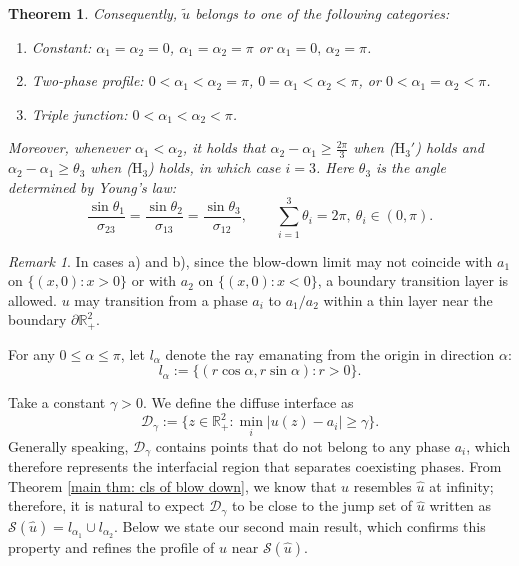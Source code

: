 \documentclass[leqno,11pt]{amsart}
\let\pa=\partial
\let\al=\alpha
\let\g=\gamma
\let\f=\frac
\let\pa=\partial
\newtheorem{theorem}{Theorem}[section]
\theoremstyle{remark}
\newtheorem{rmk}{Remark}[section]
\newcommand{\BR}{\mathbb{R}}
\begin{document}
\begin{theorem}
    
    Consequently, $\tilde{u}$ belongs to one of the following categories:
      \begin{enumerate}[label={\alph*)}]
        \item Constant: $\al_1=\al_2=0$, $\al_1=\al_2=\pi$ or $\al_1=0,\, \al_2=\pi$.
        \item Two-phase profile: $0<\al_1<\al_2=\pi$, $0=\al_1<\al_2<\pi$, or $0<\al_1=\al_2<\pi$.
        \item Triple junction: $0<\al_1<\al_2<\pi$.
    \end{enumerate}  
    Moreover, whenever $\al_1<\al_2$, it holds that $\al_2-\al_1\geq \f{2\pi}{3}$ when ($\mathrm{H}_3'$) holds and $\al_2-\al_1\geq \theta_3$ when ($\mathrm{H}_3$) holds, in which case $i=3$. Here $\theta_3$ is the angle determined by Young's law: 
        \begin{equation}\label{young's law}
            \f{\sin\theta_1}{\sigma_{23}}= \f{\sin\theta_2}{\sigma_{13}}= \f{\sin\theta_3}{\sigma_{12}}, \qquad\sum\limits_{i=1}^3 \theta_i=2\pi,\ \theta_i\in(0,\pi).
        \end{equation}

\end{theorem}

\begin{rmk}
    In cases a) and b), since the blow-down limit may not coincide with $a_1$ on $\{(x,0):x>0\}$ or with $a_2$ on $\{(x,0):x<0\}$, a boundary transition layer is allowed. $u$ may transition from a phase $a_i$ to $a_1/a_2$ within a thin layer near the boundary $\pa \BR_+^2$.
\end{rmk}

For any $0\leq \alpha\leq \pi$, let $l_\alpha$ denote the ray emanating from the origin in direction $\alpha$:
\begin{equation*}
    l_\alpha:=\{(r\cos\alpha,r\sin\alpha):r>0\}.
\end{equation*}

Take a constant $\gamma>0$. We define the diffuse interface as 
\begin{equation}\label{def:diff intef}
    \mathcal{D}_\g:=\{z\in\BR^2_+ : \min_i|u(z)-a_i|\geq \g\}.
\end{equation}
Generally speaking, $\mathcal{D}_\g$ contains points that do not belong to any phase $a_i$, which therefore represents the interfacial region that separates coexisting phases. From Theorem \ref{main thm: cls of blow down}, we know that $u$ resembles $\hat{u}$ at infinity; therefore, it is natural to expect $\mathcal{D}_{\g}$ to be close to the jump set of $\hat{u}$ written as $\mathcal{S}(\hat{u})=l_{\al_1}\cup l_{\al_2}$. Below we state our second main result, which confirms this property and refines the profile of $u$ near $\mathcal{S}(\hat{u})$.
\end{document}
